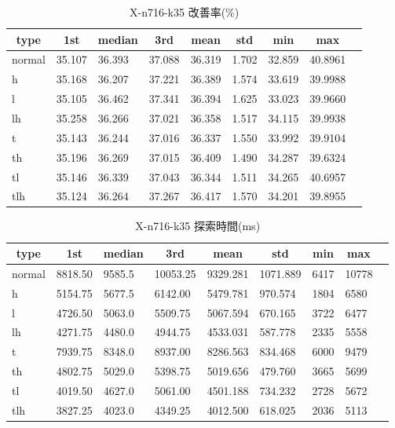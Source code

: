 \begin{table}[htbp]
    \caption{X-n716-k35 改善率(\%)}
    \begin{tabular}{|l|l|l|l|l|l|l|l|l|}\hline
    \multicolumn{1}{|c|}{\textbf{type}}
    &\multicolumn{1}{|c|}{\textbf{1st}}
    &\multicolumn{1}{c|}{\textbf{median}}
    &\multicolumn{1}{c|}{\textbf{3rd}}
    &\multicolumn{1}{c|}{\textbf{mean}}
    &\multicolumn{1}{c|}{\textbf{std}}
    &\multicolumn{1}{c|}{\textbf{min}}
    &\multicolumn{1}{c|}{\textbf{max}}\\\hline
	normal & 35.107 & 36.393 & 37.088 & 36.319 & 1.702 & 32.859 & 40.8961\\\hline
	h & 35.168 & 36.207 & 37.221 & 36.389 & 1.574 & 33.619 & 39.9988\\\hline
	l & 35.105 & 36.462 & 37.341 & 36.394 & 1.625 & 33.023 & 39.9660\\\hline
	lh & 35.258 & 36.266 & 37.021 & 36.358 & 1.517 & 34.115 & 39.9938\\\hline
	t & 35.143 & 36.244 & 37.016 & 36.337 & 1.550 & 33.992 & 39.9104\\\hline
	th & 35.196 & 36.269 & 37.015 & 36.409 & 1.490 & 34.287 & 39.6324\\\hline
	tl & 35.146 & 36.339 & 37.043 & 36.344 & 1.511 & 34.265 & 40.6957\\\hline
	tlh & 35.124 & 36.264 & 37.267 & 36.417 & 1.570 & 34.201 & 39.8955\\\hline
	\end{tabular}
\end{table}
\begin{table}[htbp]
    \caption{X-n716-k35 探索時間(ms)}
    \begin{tabular}{|l|l|l|l|l|l|l|l|l|}\hline
    \multicolumn{1}{|c|}{\textbf{type}}
    &\multicolumn{1}{|c|}{\textbf{1st}}
    &\multicolumn{1}{c|}{\textbf{median}}
    &\multicolumn{1}{c|}{\textbf{3rd}}
    &\multicolumn{1}{c|}{\textbf{mean}}
    &\multicolumn{1}{c|}{\textbf{std}}
    &\multicolumn{1}{c|}{\textbf{min}}
    &\multicolumn{1}{c|}{\textbf{max}}\\\hline
	normal & 8818.50 & 9585.5 & 10053.25 & 9329.281 & 1071.889 & 6417 & 10778\\\hline
	h & 5154.75 & 5677.5 & 6142.00 & 5479.781 & 970.574 & 1804 & 6580\\\hline
	l & 4726.50 & 5063.0 & 5509.75 & 5067.594 & 670.165 & 3722 & 6477\\\hline
	lh & 4271.75 & 4480.0 & 4944.75 & 4533.031 & 587.778 & 2335 & 5558\\\hline
	t & 7939.75 & 8348.0 & 8937.00 & 8286.563 & 834.468 & 6000 & 9479\\\hline
	th & 4802.75 & 5029.0 & 5398.75 & 5019.656 & 479.760 & 3665 & 5699\\\hline
	tl & 4019.50 & 4627.0 & 5061.00 & 4501.188 & 734.232 & 2728 & 5672\\\hline
	tlh & 3827.25 & 4023.0 & 4349.25 & 4012.500 & 618.025 & 2036 & 5113\\\hline
	\end{tabular}
\end{table}
